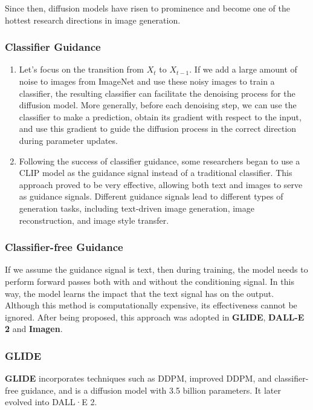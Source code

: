 \documentclass{article}
\begin{document}
Since then, diffusion models have risen to prominence and become one of the hottest research directions in 
image generation.

\subsubsection{Classifier Guidance}

\begin{enumerate}
    \item Let's focus on the transition from $X_t$ to $X_{t-1}$. If we add a large amount of noise to images 
    from ImageNet and use these noisy images to train a classifier, the resulting classifier can facilitate 
    the denoising process for the diffusion model. More generally, before each denoising step, we can use 
    the classifier to make a prediction, obtain its gradient with respect to the input, and use this 
    gradient to guide the diffusion process in the correct direction during parameter updates.
    \item Following the success of classifier guidance, some researchers began to use a CLIP model as the 
    guidance signal instead of a traditional classifier. This approach proved to be very effective, allowing 
    both text and images to serve as guidance signals. Different guidance signals lead to different types of 
    generation tasks, including text-driven image generation, image reconstruction, and image style transfer.
\end{enumerate}

\subsubsection{Classifier-free Guidance}

If we assume the guidance signal is text, then during training, the model needs to perform forward passes 
both with and without the conditioning signal. In this way, the model learns the impact that the text signal 
has on the output. Although this method is computationally expensive, its effectiveness cannot be ignored. 
After being proposed, this approach was adopted in \textbf{GLIDE}, \textbf{DALL-E 2} and \textbf{Imagen}.

\subsubsection{GLIDE}

\textbf{GLIDE} incorporates techniques such as DDPM, improved DDPM, and classifier-free guidance, and is a 
diffusion model with 3.5 billion parameters. It later evolved into DALL·E 2.
\end{document}
